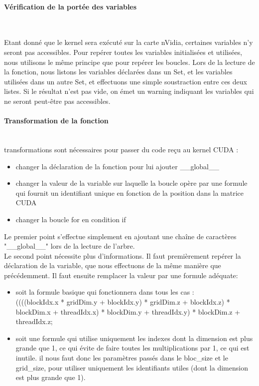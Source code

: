 \documentclass{article}
\begin{document}
	
	\paragraph{Vérification de la portée des variables}
	~~\\
	\indent

	Etant donné que le kernel sera exécuté sur la carte nVidia, certaines variables n'y seront pas accessibles. Pour repérer toutes les variables initialisées et utilisées, nous utilisons le même principe que pour repérer les boucles. Lors de la lecture de la fonction, nous listons les variables déclarées dans un Set, et les variables utilisées dans un autre Set, et effectuons une simple soustraction entre ces deux listes. Si le résultat n'est pas vide, on émet un warning indiquant les variables qui ne seront peut-être pas accessibles.
	
	\paragraph{Transformation de la fonction}
	~~\\
	 transformations sont nécessaires pour passer du code reçu au kernel CUDA :
	\begin{itemize}
		\item changer la déclaration de la fonction pour lui ajouter \_\_global\_\_
		\item changer la valeur de la variable sur laquelle la boucle opère par une formule qui fournit un identifiant unique en fonction de la position dans la matrice CUDA
		\item changer la boucle for en condition if
	\end{itemize}
	Le premier point s'effectue simplement en ajoutant une chaîne de caractères "\_\_global\_\_" lors de la lecture de l'arbre.
	\\Le second point nécessite plus d'informations. Il faut premièrement repérer la déclaration de la variable, que nous effectuons de la même manière que précédemment. Il faut ensuite remplacer la valeur par une formule adéquate:
	\begin{itemize}
	\item soit la formule basique qui fonctionnera dans tous les cas : 
	\\ ((((blockIdx.x * gridDim.y + blockIdx.y) * gridDim.z + blockIdx.z) * blockDim.x + threadIdx.x) * blockDim.y + threadIdx.y) * blockDim.z + threadIdx.z;
	\item soit une formule qui utilise uniquement les indexes dont la dimension est plus grande que 1, ce qui évite de faire toutes les multiplications par 1, ce qui est inutile. il nous faut donc les paramètres passés dans le bloc\_size et le grid\_size, pour utiliser uniquement les identifiants utiles (dont la dimension est plus grande que 1).
	\end{itemize}
	
\end{document}
